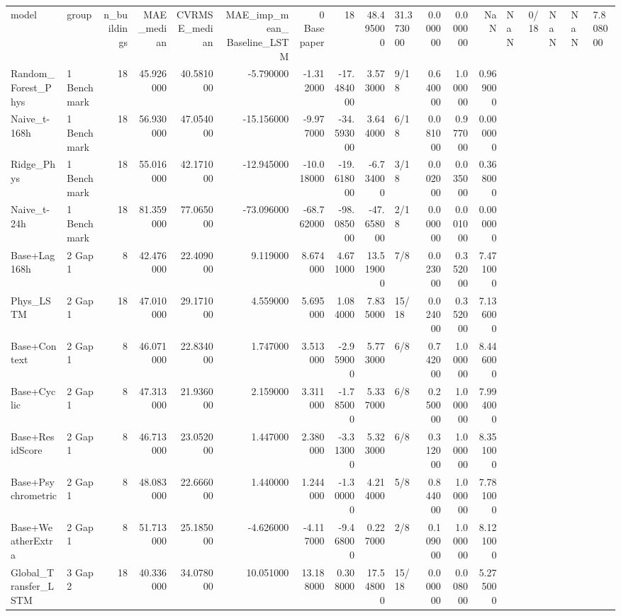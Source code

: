 \begin{tabular}{llrrrrrrrlrrr}
\toprule
model & group & n_buildings & MAE_median & CVRMSE_median & MAE_imp_mean_%
\midrule
Baseline_LSTM & 0 Base paper & 18 & 48.495000 & 31.373000 & 0.000000 & 0.000000 & NaN & NaN & 0/18 & NaN & NaN & 7.808000 \\
Random_Forest_Phys & 1 Benchmark & 18 & 45.926000 & 40.581000 & -5.790000 & -1.312000 & -17.484000 & 3.573000 & 9/18 & 0.640000 & 1.000000 & 0.969000 \\
Naive_t-168h & 1 Benchmark & 18 & 56.930000 & 47.054000 & -15.156000 & -9.977000 & -34.593000 & 3.644000 & 6/18 & 0.081000 & 0.977000 & 0.000000 \\
Ridge_Phys & 1 Benchmark & 18 & 55.016000 & 42.171000 & -12.945000 & -10.018000 & -19.618000 & -6.734000 & 3/18 & 0.002000 & 0.035000 & 0.368000 \\
Naive_t-24h & 1 Benchmark & 18 & 81.359000 & 77.065000 & -73.096000 & -68.762000 & -98.085000 & -47.658000 & 2/18 & 0.000000 & 0.001000 & 0.000000 \\
Base+Lag168h & 2 Gap 1 & 8 & 42.476000 & 22.409000 & 9.119000 & 8.674000 & 4.671000 & 13.519000 & 7/8 & 0.023000 & 0.352000 & 7.471000 \\
Phys_LSTM & 2 Gap 1 & 18 & 47.010000 & 29.171000 & 4.559000 & 5.695000 & 1.084000 & 7.835000 & 15/18 & 0.024000 & 0.352000 & 7.136000 \\
Base+Context & 2 Gap 1 & 8 & 46.071000 & 22.834000 & 1.747000 & 3.513000 & -2.959000 & 5.773000 & 6/8 & 0.742000 & 1.000000 & 8.446000 \\
Base+Cyclic & 2 Gap 1 & 8 & 47.313000 & 21.936000 & 2.159000 & 3.311000 & -1.785000 & 5.337000 & 6/8 & 0.250000 & 1.000000 & 7.994000 \\
Base+ResidScore & 2 Gap 1 & 8 & 46.713000 & 23.052000 & 1.447000 & 2.380000 & -3.313000 & 5.323000 & 6/8 & 0.312000 & 1.000000 & 8.351000 \\
Base+Psychrometric & 2 Gap 1 & 8 & 48.083000 & 22.666000 & 1.440000 & 1.244000 & -1.300000 & 4.214000 & 5/8 & 0.844000 & 1.000000 & 7.781000 \\
Base+WeatherExtra & 2 Gap 1 & 8 & 51.713000 & 25.185000 & -4.626000 & -4.117000 & -9.468000 & 0.227000 & 2/8 & 0.109000 & 1.000000 & 8.121000 \\
Global_Transfer_LSTM & 3 Gap 2 & 18 & 40.336000 & 34.078000 & 10.051000 & 13.188000 & 0.308000 & 17.548000 & 15/18 & 0.000000 & 0.008000 & 5.275000 \\

\end{tabular}
